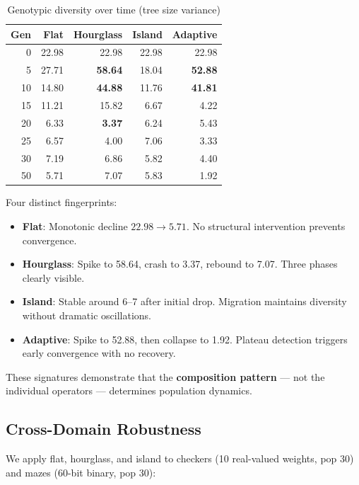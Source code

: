 \documentclass[10pt]{article}
\begin{document}
\begin{table}[ht]
\centering
\caption{Genotypic diversity over time (tree size variance)}
\label{tab:diversity-time}
\begin{tabular}{@{}rrrrr@{}}
\toprule
\textbf{Gen} & \textbf{Flat} & \textbf{Hourglass} & \textbf{Island} & \textbf{Adaptive} \\
\midrule
0   & 22.98 & 22.98          & 22.98 & 22.98 \\
5   & 27.71 & \textbf{58.64} & 18.04 & \textbf{52.88} \\
10  & 14.80 & \textbf{44.88} & 11.76 & \textbf{41.81} \\
15  & 11.21 & 15.82          & 6.67  & 4.22 \\
20  & 6.33  & \textbf{3.37}  & 6.24  & 5.43 \\
25  & 6.57  & 4.00           & 7.06  & 3.33 \\
30  & 7.19  & 6.86           & 5.82  & 4.40 \\
50  & 5.71  & 7.07           & 5.83  & 1.92 \\
\bottomrule
\end{tabular}
\end{table}

Four distinct fingerprints:

\begin{itemize}
  \item \textbf{Flat}: Monotonic decline $22.98 \to 5.71$. No structural intervention prevents convergence.
  \item \textbf{Hourglass}: Spike to 58.64, crash to 3.37, rebound to 7.07. Three phases clearly visible.
  \item \textbf{Island}: Stable around 6--7 after initial drop. Migration maintains diversity without dramatic oscillations.
  \item \textbf{Adaptive}: Spike to 52.88, then collapse to 1.92. Plateau detection triggers early convergence with no recovery.
\end{itemize}

These signatures demonstrate that the \textbf{composition pattern} --- not the individual operators --- determines population dynamics.


\subsection{Cross-Domain Robustness}

We apply flat, hourglass, and island to checkers (10 real-valued weights, pop 30) and mazes (60-bit binary, pop 30):
\end{document}
